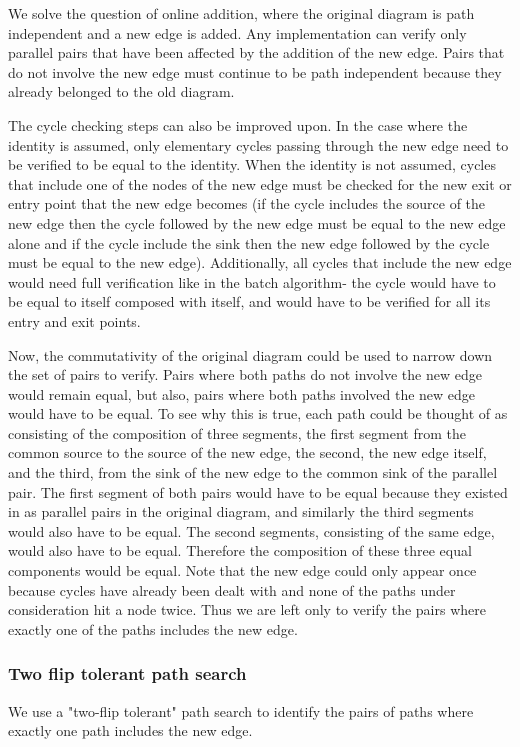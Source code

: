 \documentclass[sigplan,review,anonymous]{acmart}
\begin{document}
We solve the question of online addition, where the original diagram is path independent and a new edge is added.  Any implementation can verify only parallel pairs that have been affected by the addition of the new edge. Pairs that do not involve the new edge must continue to be path independent because they already belonged to the old diagram.

The cycle checking steps can also be improved upon. In the case where the identity is assumed, only elementary cycles passing through the new edge need to be verified to be equal to the identity. When the identity is not assumed, cycles that include one of the nodes of the new edge must be checked for the new exit or entry point that the new edge becomes (if the cycle includes the source of the new edge then the cycle followed by the new edge must be equal to the new edge alone and if the cycle include the sink then the new edge followed by the cycle must be equal to the new edge).
Additionally, all cycles that include the new edge would need full verification like in the batch algorithm- the cycle would have to be equal to itself composed with itself, and would have to be verified for all its entry and exit points.

Now, the commutativity of the original diagram could be used to narrow down the set of pairs to verify. Pairs where both paths do not involve the new edge would remain equal, but also, pairs where both paths involved the new edge would have to be equal. To see why this is true, each path could be thought of as consisting of the composition of three segments, the first segment from the common source to the source of the new edge, the second, the new edge itself, and the third, from the sink of the new edge to the common sink of the parallel pair. The first segment of both pairs would have to be equal because they existed in as parallel pairs in the original diagram, and similarly the third segments would also have to be equal. The second segments, consisting of the same edge, would also have to be equal. Therefore the composition of these three equal components would be equal. Note that the new edge could only appear once because cycles have already been dealt with and none of the paths under consideration hit a node twice. Thus we are left only to verify the pairs where exactly one of the paths includes the new edge.

\subsubsection{Two flip tolerant path search}
We use a "two-flip tolerant" path search to identify the pairs of paths where exactly one path includes the new edge. 
\end{document}
